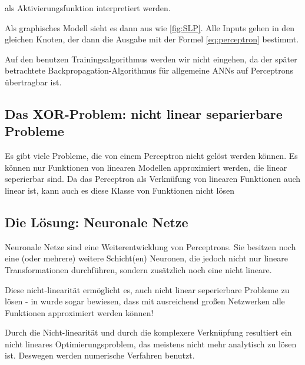 als Aktivierungsfunktion interpretiert werden.

Als graphisches Modell sieht es dann aus wie \ref{fig:SLP}. Alle Inputs gehen in den gleichen Knoten, der dann die Ausgabe mit der Formel \ref{eq:perceptron} bestimmt. 

Auf den benutzen Trainingsalgorithmus werden wir nicht eingehen, da der später betrachtete Backpropagation-Algorithmus für allgemeine ANNs auf Perceptrons übertragbar ist.

\subsection{Das XOR-Problem: nicht linear separierbare Probleme}
Es gibt viele Probleme, die von einem Perceptron nicht gelöst werden können. Es können nur Funktionen von linearen Modellen approximiert werden, die linear seperierbar sind. Da das Perceptron als Verknüfung von linearen Funktionen auch linear ist, kann auch es diese Klasse von Funktionen nicht lösen

\subsection{Die Lösung: Neuronale Netze}
Neuronale Netze sind eine Weiterentwicklung von Perceptrons. Sie besitzen noch eine (oder mehrere) weitere Schicht(en) Neuronen, die jedoch nicht nur lineare Transformationen durchführen, sondern zusätzlich noch eine nicht lineare.

Diese nicht-linearität ermöglicht es, auch nicht linear seperierbare Probleme zu lösen - in \cite{cybenko1989approximation} wurde sogar bewiesen, dass mit ausreichend großen Netzwerken alle Funktionen approximiert werden können!

Durch die Nicht-linearität und durch die komplexere Verknüpfung resultiert ein nicht lineares Optimierungsproblem, das meistens nicht mehr analytisch zu lösen ist. Deswegen werden numerische Verfahren benutzt.


